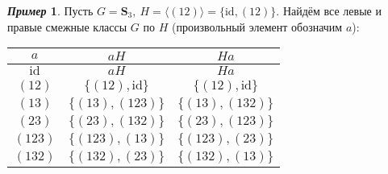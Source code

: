 \documentclass[a4paper, 14pt]{extarticle}
\newcommand{\n}{\par}
\newcommand{\symmetrical}{\mathbf{S}}
\newcommand{\id}{\mathrm{id}}
\theoremstyle{definition}
\newtheorem*{exmpl*}{\textit{Пример}}
\theoremstyle{plain}
\numberwithin{theorem}{section}
\numberwithin{definition}{section}
\numberwithin{statement}{section}
\numberwithin{lemma}{section}
\numberwithin{consequence}{section}
\begin{document}
	\begin{exmpl*}
		Пусть $G = \symmetrical_3, \ H = \langle(12)\rangle = \{\id, (12)\}.$ Найдём все левые и правые смежные классы $G$ по $H$ (произвольный элемент обозначим $a$):
		\begin{center}
			\begin{tabular}{c|c|c}
				$a$ & $aH$ & $Ha$\\
				\hline
				$\id$ & $aH$ & $Ha$ \\
				\hline
				$(12)$ & $\{(12), \id\}$ & $\{(12), \id\}$ \\
				\hline
				$(13)$ & $\{(13), (123)\}$ & $\{(13), (132)\}$ \\
				\hline
				$(23)$ & $\{(23), (132)\}$ & $\{(23), (123)\}$ \\
				\hline
				$(123)$ & $\{(123), (13)\}$ & $\{(123), (23)\}$ \\
				\hline
				$(132)$ & $\{(132), (23)\}$ & $\{(132), (13)\}$
			\end{tabular}
		\end{center} \n
	\end{exmpl*}
	\newpage
\end{document}
